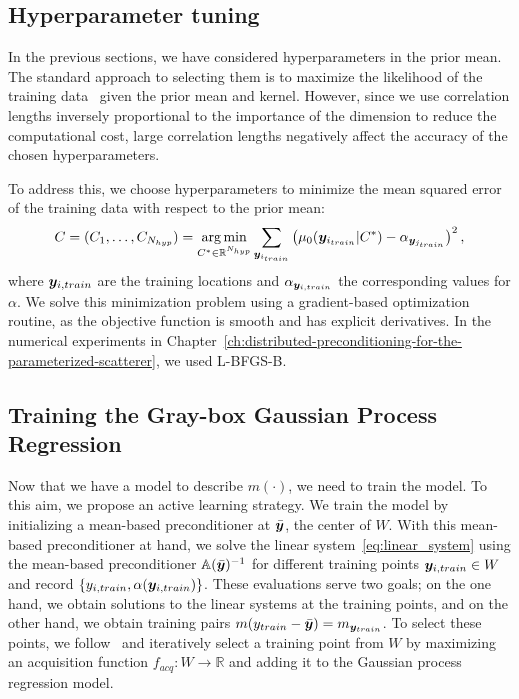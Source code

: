 \subsection{Hyperparameter tuning}\label{subsec:hyperparameter-tuning}
In the previous sections, we have considered hyperparameters in the prior mean.
The standard approach to selecting them is to maximize the likelihood of the training data~\cite{jones1998,rasmussen2000} given the prior mean and kernel.
However, since we use correlation lengths inversely proportional to the importance of the dimension to reduce the computational cost, large correlation lengths negatively affect the accuracy of the chosen hyperparameters.

To address this, we choose hyperparameters to minimize the mean squared error of the training data with respect to the prior mean:
\begin{equation*}
    C=(C_1, \ldots, C_{N_{hyp}}) = \operatorname*{arg\,min}_{C^\ast \in \mathbb{R}^{N_{hyp}}} \sum_{{\bm{y}}_{i_{train}}}\left(\mu_0({\bm{y}}_{i_{train}}| C^\ast) - \alpha_{{\bm{y}}_{j_{train}}}  \right)^2,
\end{equation*}
where ${\bm{y}}_{i,{train}}$ are the training locations and $\alpha_{{\bm{y}}_{i,{train}}}$ the corresponding values for $\alpha$.
We solve this minimization problem using a gradient-based optimization routine, as the objective function is smooth and has explicit derivatives.
In the numerical experiments in Chapter~\ref{ch:distributed-preconditioning-for-the-parameterized-scatterer}, we used L-BFGS-B.

\subsection{Training the Gray-box Gaussian Process Regression}\label{subsec:gpr-training}
Now that we have a model to describe $m(\cdot)$, we need to train the model.
To this aim, we propose an active learning strategy.
We train the model by initializing a mean-based preconditioner at $\bar{{\bm{y}}}$, the center of $W$.
With this mean-based preconditioner at hand, we solve the linear system~\eqref{eq:linear_system} using the mean-based preconditioner $\mathbb{A}(\bar{{\bm{y}}})^{-1}$ for different training points ${\bm{y}}_{i,train} \in W$ and record $\left\{y_{i,train}, \alpha({\bm{y}}_{i,train})  \right\}$.
These evaluations serve two goals; on the one hand, we obtain solutions to the linear systems at the training points, and on the other hand, we obtain training pairs $m(y_{train}-\bar{{\bm{y}}})=m_{{\bm{y}}_{train}}$.
To select these points, we follow~\cite{astudillo2022} and iteratively select a training point from $W$ by maximizing an acquisition function $f_{acq}:W\to\mathbb{R}$ and adding it to the Gaussian process regression model.

